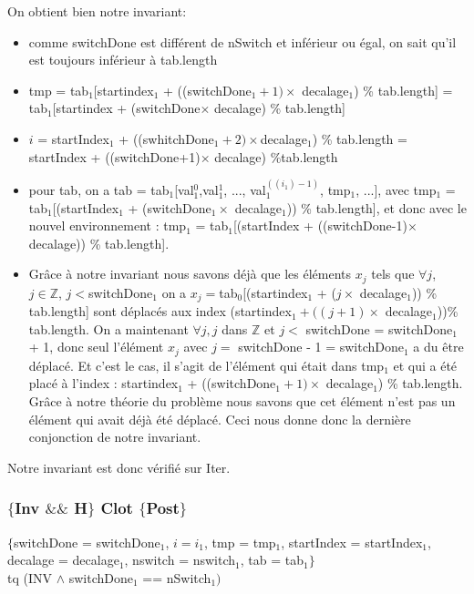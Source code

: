 On obtient bien notre invariant:
\begin{itemize}
	\item comme switchDone est différent de nSwitch et inférieur ou égal, on sait qu'il est toujours inférieur à tab.length
	\item tmp = tab$_{1}$[startindex$_{1}$ + ((switchDone$_{1}+1)\times $ decalage$_{1}$) \% tab.length] 
		\subitem = tab$_{1}$[startindex + (switchDone$\times$ decalage) \% tab.length]
	\item $i$ = startIndex$_{1}$ + ((swhitchDone$_{1}+2)\times $decalage$_{1}$) \% tab.length
		\subitem = startIndex + ((switchDone+1)$\times$ decalage) \%tab.length
	\item pour tab, on a tab = tab$_{1}$[val$_{1}^{0}$,val$_{1}^{1}$, ..., val$_{1}^{((i_{1})-1)}$, tmp$_{1}$, ...], avec tmp$_{1}$ = tab$_{1}$[(startIndex$_{1}$ + (switchDone$_{1}\times$ decalage$_{1}$)) \% tab.length], et donc avec le nouvel environnement : tmp$_{1}$ = tab$_{1}$[(startIndex + ((switchDone-1)$\times$ decalage)) \% tab.length]. 
	\item Grâce à notre invariant nous savons déjà que les éléments $x_{j}$ tels que $\forall j$, $j \in \mathbb{Z}$, $j<$switchDone$_{1}$ on a $x_{j}=$tab$_{0}$[(startindex$_{1}$ + ($j\times$ decalage$_{1}$)) \% tab.length] sont déplacés aux index (startindex$_{1} + ((j+1)\times$ decalage$_{1}$))\% tab.length. On a maintenant $\forall j, j$ dans $\mathbb{Z}$ et $j<$ switchDone = switchDone$_{1}$ + 1, donc seul l'élément $x_{j}$ avec $j=$ switchDone - 1 = switchDone$_{1}$ a du être déplacé. Et c'est le cas, il s'agit de l'élément qui était dans tmp$_{1}$ et qui a été placé à l'index : startindex$_{1}$ + ((switchDone$_{1}+1)\times$ decalage$_{1}$) \% tab.length. Grâce à notre théorie du problème nous savons que cet élément n'est pas un élément qui avait déjà été déplacé. Ceci nous donne donc la dernière conjonction de notre invariant. \\
\end{itemize}

Notre invariant est donc vérifié sur Iter. \\

\subsubsection*{$\{$Inv $\&\&$ H$\}$ Clot $\{$Post$\}$}

$\{$switchDone = switchDone$_{1}$, $i = i_{1}$, tmp = tmp$_{1}$, startIndex = startIndex$_{1}$, decalage = decalage$_{1}$, nswitch = nswitch$_{1}$, tab = tab$_{1}\}$\\ 
tq (INV $\wedge$ switchDone$_{1}$ == nSwitch$_{1})$ \\

